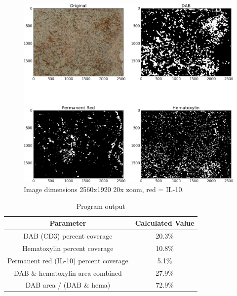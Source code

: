 \documentclass[12pt]{article}
\begin{document}
\begin{figure}[H]
  \includegraphics[width=\linewidth]{11_IL10_20x.png}
  \caption{Image dimensions 2560x1920
20x zoom, red = IL-10.}
  \label{fig:11 IL10}
\end{figure}


\begin{table}[H]
\centering
\caption{Program output}
\label{program output}
\begin{tabular}{|c|c|}
\hline
\textbf{Parameter} & \textbf{Calculated Value} \\ \hline
DAB (CD3) percent coverage & 20.3\% \\ \hline
Hematoxylin percent coverage & 10.8\% \\ \hline
Permanent red (IL-10) percent coverage & 5.1\% \\ \hline
DAB \& hematoxylin area combined & 27.9\% \\ \hline
DAB area / (DAB \& hema) & 72.9\% \\ \hline
\end{tabular}
\end{table}

\end{document}
